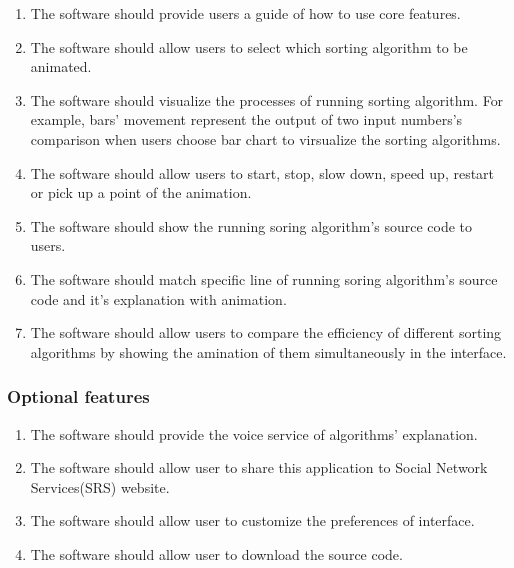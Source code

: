 \documentclass[12pt]{article}
\begin{document}
\begin{enumerate}
\item The software should provide users a guide of how to use core features.  

\item The software should allow users to select which sorting algorithm to be animated.

\item The software should visualize the processes of running sorting algorithm. For example, bars' movement represent the output of two input numbers's comparison when users choose bar chart to virsualize the sorting algorithms. 

\item The software should allow users to start, stop, slow down, speed up, restart or pick up a point of the animation.

\item The software should show the running soring algorithm’s source code to users.

\item The software should match specific line of running soring algorithm’s source code and it's explanation with animation.

\item The software should allow users to compare the efficiency of different sorting algorithms by showing the amination of them simultaneously in the interface.


\end{enumerate}

\subsubsection{Optional features}

\begin{enumerate}
\item The software should provide the voice service of algorithms’ explanation. 

\item The software should allow user to share this application to Social Network Services(SRS) website.

\item The software should allow user to customize the preferences of interface.   

\item The software should allow user to download the source code.

\end{enumerate}
\end{document}
